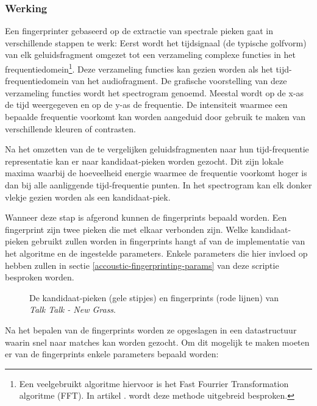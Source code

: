 \subsubsection{Werking}

Een fingerprinter gebaseerd op de extractie van spectrale pieken gaat in verschillende stappen te werk: 
Eerst wordt het tijdsignaal (de typische golfvorm) van elk geluidsfragment omgezet tot een verzameling complexe functies in het frequentiedomein\footnote{Een veelgebruikt algoritme hiervoor is het Fast Fourrier Transformation algoritme (FFT). In artikel \cite{oppenheim1970speech}. wordt deze methode uitgebreid besproken.}. Deze verzameling functies kan gezien worden als het tijd-frequentiedomein van het audiofragment. De grafische voorstelling van deze verzameling functies wordt het spectrogram genoemd. Meestal wordt op de x-as de tijd weergegeven en op de y-as de frequentie. De intensiteit waarmee een bepaalde frequentie voorkomt kan worden aangeduid door gebruik te maken van verschillende kleuren of contrasten. 

Na het omzetten van de te vergelijken geluidsfragmenten naar hun tijd-frequentie representatie kan er naar kandidaat-pieken worden gezocht. Dit zijn lokale maxima waarbij de hoeveelheid energie waarmee de frequentie voorkomt hoger is dan bij alle aanliggende tijd-frequentie punten\cite{six2014panako}. In het spectrogram kan elk donker vlekje gezien worden als een kandidaat-piek.

Wanneer deze stap is afgerond kunnen de fingerprints bepaald worden. Een fingerprint zijn twee pieken die met elkaar verbonden zijn. Welke kandidaat-pieken gebruikt zullen worden in fingerprints hangt af van de implementatie van het algoritme en de ingestelde parameters. Enkele parameters die hier invloed op hebben zullen in sectie \ref{accoustic-fingerprinting-params} van deze scriptie besproken worden.

\begin{figure}[h!]
	\captionsetup{width=0.7\textwidth}
	\caption[Kandidaat-pieken en fingerprints]{De kandidaat-pieken (gele stipjes) en fingerprints (rode lijnen)  van \textit{Talk Talk - New Grass}.}
	\begin{center}
		\advance\parskip0.3cm
		
	\end{center}
\end{figure}

Na het bepalen van de fingerprints worden ze opgeslagen in een datastructuur waarin snel naar matches kan worden gezocht.
Om dit mogelijk te maken moeten er van de fingerprints enkele parameters bepaald worden:

